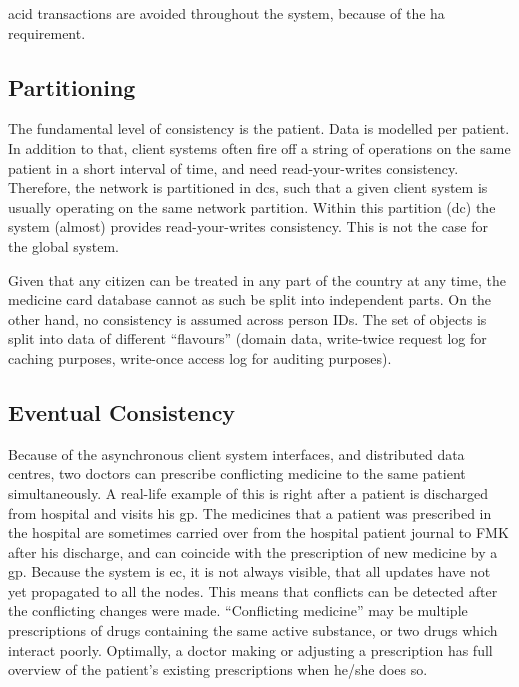 \documentclass[english]{article}
\begin{document}

\gls{acid} transactions are avoided throughout the system, because of the \gls{ha} requirement.


\subsection{Partitioning}

The fundamental level of consistency is the patient. Data is modelled per patient. In addition to that, client systems often fire off a
string of operations on the same patient in a short interval of time, and need read-your-writes consistency. Therefore, the network is partitioned
in \glspl{dc}, such that a given client system is usually operating on the same network partition. Within this partition (\gls{dc}) the system (almost) provides read-your-writes consistency. This is not the case for the global system.

Given that any citizen can be treated in any part of the country at any time, the medicine card database cannot as such be split into independent parts. On the other hand, no consistency is assumed across person IDs. The set of objects is split into data of different ``flavours'' (domain data, write-twice request log for caching purposes, write-once access log for auditing purposes).


\subsection{Eventual Consistency}

Because of the asynchronous client system interfaces, and distributed data centres, two doctors can prescribe conflicting medicine to the
same patient simultaneously. A real-life example of this is right after a patient is discharged from hospital and visits his \gls{gp}. The medicines that a patient was prescribed in the hospital are sometimes carried over from the hospital patient journal to FMK after his discharge, and can coincide with the prescription of new medicine by a \gls{gp}. Because the system is \gls{ec}, it is not always visible, that all updates have not yet propagated to all the nodes. This means that conflicts can be detected after the conflicting changes were made. ``Conflicting medicine'' may be multiple prescriptions of drugs containing the same active substance, or two drugs which interact poorly. Optimally, a doctor making or adjusting a prescription has full overview of the patient's existing prescriptions when he/she does so. 
\end{document}
